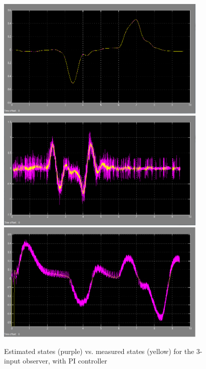 \begin{figure}[H]
\includegraphics[width=0.9\textwidth,height=0.1\textheight]{PI_Pitch.png}\\
\includegraphics[width=0.9\textwidth,height=0.1\textheight]{PI_Pitch_Rate.png}\\
\includegraphics[width=0.9\textwidth,height=0.1\textheight]{PI_Elevation_Rate.png}
\caption{Estimated states (purple) vs. measured states (yellow) for the 3-input observer, with PI controller}
\label{fig:my_label2}
\end{figure}

